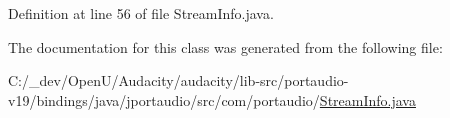 Definition at line 56 of file Stream\+Info.\+java.



The documentation for this class was generated from the following file\+:\begin{DoxyCompactItemize}
\item 
C\+:/\+\_\+dev/\+Open\+U/\+Audacity/audacity/lib-\/src/portaudio-\/v19/bindings/java/jportaudio/src/com/portaudio/\hyperlink{_stream_info_8java}{Stream\+Info.\+java}\end{DoxyCompactItemize}
